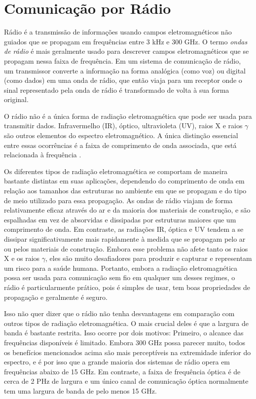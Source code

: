 \documentclass[
	12pt,				%
	openright,			%
	twoside,			%
	a4paper,			%
	english,			%
	french,				%
	spanish,			%
	brazil				%
	]{abntex2}
\begin{document}
\section{Comunicação por Rádio}

Rádio é a transmissão de informações usando campos eletromagnéticos não guiados que se propagam em frequências entre 3 kHz e 300 GHz. O termo \emph{ondas de rádio} é mais geralmente usado para descrever campos eletromagnéticos que se propagam nessa faixa de frequência. Em um sistema de comunicação de rádio, um transmissor converte a informação na forma analógica (como voz) ou digital (como dados) em uma onda de rádio, que então viaja para um receptor onde o sinal representado pela onda de rádio é transformado de volta à sua forma original.

O rádio não é a única forma de radiação eletromagnética que pode ser usada para transmitir dados. Infravermelho (IR), óptico, ultravioleta (UV), raios X e raios $\gamma$ são outros elementos do espectro eletromagnético. A única distinção essencial entre essas ocorrências é a faixa de comprimento de onda associada, que está relacionada à frequência \cite{ellingson_2016}.

Os diferentes tipos de radiação eletromagnética se comportam de maneira bastante distintas em suas aplicações, dependendo do comprimento de onda em relação aos tamanhos das estruturas no ambiente em que se propagam e do tipo de meio utilizado para essa propagação. As ondas de rádio viajam de forma relativamente eficaz através do ar e da maioria dos materiais de construção, e são espalhadas em vez de absorvidas e dissipadas por estruturas maiores que um comprimento de onda. Em contraste, as radiações IR, óptica e UV tendem a se dissipar significativamente mais rapidamente à medida que se propagam pelo ar ou pelos materiais de construção. Embora esse problema não afete tanto os raios X e os raios $\gamma$, eles são muito desafiadores para produzir e capturar e representam um risco para a saúde humana. Portanto, embora a radiação eletromagnética possa ser usada para comunicação sem fio em qualquer um desses regimes, o rádio é particularmente prático, pois é simples de usar, tem boas propriedades de propagação e geralmente é seguro.

Isso não quer dizer que o rádio não tenha desvantagens em comparação com outros tipos de radiação eletromagnética. O mais crucial deles é que a largura de banda é bastante restrita. Isso ocorre por dois motivos: Primeiro, o alcance das frequências disponíveis é limitado. Embora 300 GHz possa parecer muito, todos os benefícios mencionados acima são mais perceptíveis na extremidade inferior do espectro, e é por isso que a grande maioria dos sistemas de rádio opera em frequências abaixo de 15 GHz. Em contraste, a faixa de frequência óptica é de cerca de 2 PHz de largura e um único canal de comunicação óptica normalmente tem uma largura de banda de pelo menos 15 GHz. 
\end{document}
